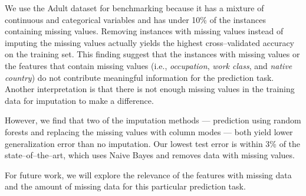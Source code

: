 \documentclass[10pt,twocolumn,letterpaper]{article}
\begin{document}
We use the Adult dataset for benchmarking because it has a mixture of continuous and categorical variables and has under 10\% of the instances containing missing values. Removing instances with missing values instead of imputing the missing values actually yields the highest cross--validated accuracy on the training set. This finding suggest that the instances with missing values or the features that contain missing values (i.e., \textit{occupation}, \textit{work class}, and \textit{native country}) do not contribute meaningful information for the prediction task. Another interpretation is that there is not enough missing values in the training data for imputation to make a difference.

However, we find that two of the imputation methods --- prediction using random forests and replacing the missing values with column modes --- both yield lower generalization error than no imputation. Our lowest test error is within 3\% of the state--of--the--art, which uses Naive Bayes and removes data with missing values. 

For future work, we will explore the relevance of the features with missing data and the amount of missing data for this particular prediction task. 

{\small


}
\end{document}
